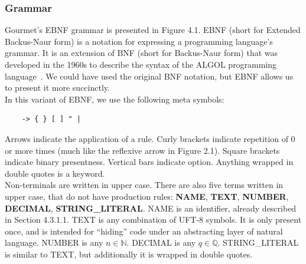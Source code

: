 \subsubsection{Grammar}

Gourmet's EBNF grammar is presented in Figure 4.1. EBNF (short for Extended Backus-Naur form) is a notation for expressing a programming language's grammar. It is an extension of BNF (short for Backus-Naur form) that was developed in the 1960s to describe the syntax of the ALGOL programming language~\cite{feynman2016ebnf}. We could have used the original BNF notation, but EBNF allows us to present it more succinctly. \hfill \\

In this variant of EBNF, we use the following meta symbols:

\begin{lstlisting}
    -> { } [ ] " |
\end{lstlisting}

Arrows indicate the application of a rule. Curly brackets indicate repetition of 0 or more times (much like the reflexive arrow in Figure 2.1). Square brackets indicate binary presentness. Vertical bars indicate option. Anything wrapped in double quotes is a keyword. \hfill \\

Non-terminals are written in upper case. There are also five terms written in upper case, that do not have production rules: \textbf{NAME}, \textbf{TEXT}, \textbf{NUMBER}, \textbf{DECIMAL}, \textbf{STRING\_LITERAL}. NAME is an identifier, already described in Section 4.3.1.1. TEXT is any combination of UFT-8 symbols. It is only present once, and is intended for ``hiding'' code under an abstracting layer of natural language. NUMBER is any $n \in \mathbb{N}$. DECIMAL is any $q \in \mathbb{Q}$. STRING\_LITERAL is similar to TEXT, but additionally it is wrapped in double quotes. \hfill \\


